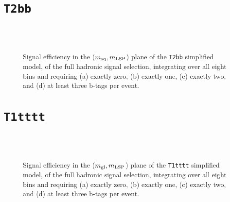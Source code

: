 \newpage
\section{\texttt{T2bb}\label{app:sig-eff-t2bb}}

\begin{figure}[h!]
  \begin{center}
     \\
     \\
    \caption{\label{fig:sig-eff-t2bb}Signal efficiency in the ($m_{\rm
        sq},m_{\rm LSP}$) plane of the \texttt{T2bb} simplified model,
      of the full hadronic signal selection, integrating over all
      eight \HT bins and requiring (a) exactly zero, (b) exactly
      one, (c) exactly two, and (d) at least three b-tags per event.}
  \end{center}
\end{figure}

\newpage
\section{\texttt{T1tttt}\label{app:sig-eff-t1tttt}}

\begin{figure}[h!]
  \begin{center}
     \\
     \\
    \caption{\label{fig:sig-eff-t1tttt}Signal efficiency in the ($m_{\rm
        gl},m_{\rm LSP}$) plane of the \texttt{T1tttt} simplified model,
      of the full hadronic signal selection, integrating over all
      eight \HT bins and requiring (a) exactly zero, (b) exactly
      one, (c) exactly two, and (d) at least three b-tags per event.}
  \end{center}
\end{figure}

